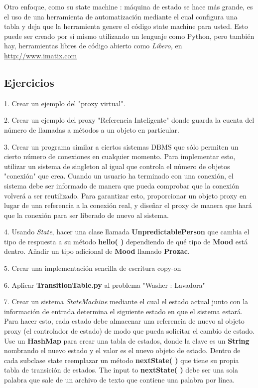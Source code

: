 \documentclass{article}
\begin{document}
Otro enfoque, como su state machine : máquina de estado se hace más grande, es el uso de una herramienta de automatización mediante el cual configura una tabla y deja que la herramienta genere el código state machine para usted. Esto puede ser creado por sí mismo utilizando un lenguaje como Python, pero también hay, herramientas libres de código abierto como \textit{ Libero,} en \textcolor[rgb]{0.2,0.5,0.7}{\underline{http://www.imatix.com}} \newline 

\subsection{Ejercicios}

1. Crear un ejemplo del "proxy virtual". \newline

2. Crear un ejemplo del proxy "Referencia Inteligente" donde guarda la cuenta del número de llamadas a métodos a un objeto en particular. \newline

3. Crear un programa similar a ciertos sistemas DBMS que sólo permiten un cierto número de conexiones en cualquier momento. Para implementar esto, utilizar un sistema de singleton al igual que controla el número de objetos "conexión" que crea. Cuando un usuario ha terminado con una conexión, el sistema debe ser informado de manera que pueda comprobar que la conexión volverá a ser reutilizado. Para garantizar esto, proporcionar un objeto proxy en lugar de una referencia a la conexión real, y diseñar el proxy de manera que hará que la conexión para ser liberado de nuevo al sistema.   \newline

4. Usando \textit{State}, hacer una clase llamada \textbf{UnpredictablePerson} que cambia el tipo de respuesta a su método \textbf{hello( )} dependiendo de qué tipo de \textbf{Mood} está dentro. Añadir un tipo adicional de \textbf{Mood} llamado \textbf{Prozac}.  \newline

5. Crear una implementación sencilla de escritura copy-on   \newline

6. Aplicar \textbf{TransitionTable.py} al problema "Washer : Lavadora"  \newline

7. Crear un sistema \textit{StateMachine} mediante el cual el estado actual junto con la información de entrada determina el siguiente estado en que el sistema estará. Para hacer esto, cada estado debe almacenar una referencia de nuevo al objeto proxy (el controlador de estado) de modo que pueda solicitar el cambio de estado. Use un \textbf{HashMap} para crear una tabla de estados, donde la clave es un \textbf{String} nombrando el nuevo estado y el valor es el nuevo objeto de estado. Dentro de cada subclase state reemplazar un método \textbf{nextState( )} que tiene su propia tabla de transición de estados. The input to \textbf{nextState( )} debe ser una sola palabra que sale de un archivo de texto que contiene una palabra por línea.  \newline
\end{document}
